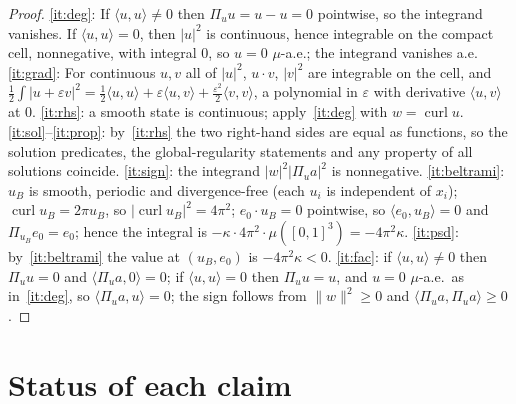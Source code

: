 \documentclass[11pt,a4paper]{article}
\theoremstyle{definition}
\theoremstyle{remark}
\newcommand{\ip}[2]{\langle #1,#2\rangle}
\begin{document}
\begin{proof}
\ref{it:deg}: If $\ip uu\ne0$ then $\Pi_uu=u-u=0$ pointwise, so the integrand vanishes. If
$\ip uu=0$, then $|u|^2$ is continuous, hence integrable on the compact cell, nonnegative, with
integral $0$, so $u=0$ $\mu$-a.e.; the integrand vanishes a.e.
\ref{it:grad}: For continuous $u,v$ all of $|u|^2$, $u\cdot v$, $|v|^2$ are integrable on the cell, and
$\frac12\int|u+\varepsilon v|^2=\frac12\ip uu+\varepsilon\ip uv+\frac{\varepsilon^2}2\ip vv$,
a polynomial in $\varepsilon$ with derivative $\ip uv$ at $0$.
\ref{it:rhs}: a smooth state is continuous; apply~\ref{it:deg} with $w=\operatorname{curl}u$.
\ref{it:sol}--\ref{it:prop}: by~\ref{it:rhs} the two right-hand sides are equal as functions, so the
solution predicates, the global-regularity statements and any property of all solutions coincide.
\ref{it:sign}: the integrand $|w|^2|\Pi_ua|^2$ is nonnegative.
\ref{it:beltrami}: $u_B$ is smooth, periodic and divergence-free (each $u_i$ is independent of
$x_i$); $\operatorname{curl}u_B=2\pi u_B$, so $|\operatorname{curl}u_B|^2=4\pi^2$; $e_0\cdot u_B=0$
pointwise, so $\ip{e_0}{u_B}=0$ and $\Pi_{u_B}e_0=e_0$; hence the integral is
$-\kappa\cdot4\pi^2\cdot\mu([0,1]^3)=-4\pi^2\kappa$.
\ref{it:psd}: by~\ref{it:beltrami} the value at $(u_B,e_0)$ is $-4\pi^2\kappa<0$.
\ref{it:fac}: if $\ip uu\ne0$ then $\Pi_uu=0$ and $\ip{\Pi_ua}{0}=0$; if $\ip uu=0$ then $\Pi_uu=u$,
and $u=0$ $\mu$-a.e.\ as in~\ref{it:deg}, so $\ip{\Pi_ua}{u}=0$; the sign follows from $\|w\|^2\ge0$ and $\ip{\Pi_ua}{\Pi_ua}\ge0$.
\end{proof}

\section{Status of each claim}
\end{document}
